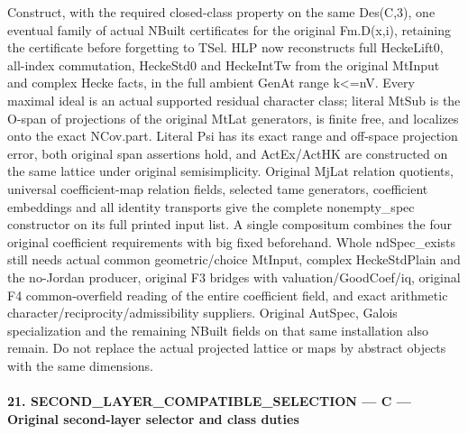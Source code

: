Construct, with the required closed-class property on the same Des(C,3), one eventual family of actual NBuilt certificates for the original Fm.D(x,i), retaining the certificate before forgetting to TSel. HLP now reconstructs full HeckeLift0, all-index commutation, HeckeStd0 and HeckeIntTw from the original MtInput and complex Hecke facts, in the full ambient GenAt range k<=nV. Every maximal ideal is an actual supported residual character class; literal MtSub is the O-span of projections of the original MtLat generators, is finite free, and localizes onto the exact NCov.part. Literal Psi has its exact range and off-space projection error, both original span assertions hold, and ActEx/ActHK are constructed on the same lattice under original semisimplicity. Original MjLat relation quotients, universal coefficient-map relation fields, selected tame generators, coefficient embeddings and all identity transports give the complete nonempty\_\allowbreak spec constructor on its full printed input list. A single compositum combines the four original coefficient requirements with big fixed beforehand. Whole ndSpec\_\allowbreak exists still needs actual common geometric/choice MtInput, complex HeckeStdPlain and the no-Jordan producer, original F3 bridges with valuation/GoodCoef/iq, original F4 common-overfield reading of the entire coefficient field, and exact arithmetic character/reciprocity/admissibility suppliers. Original AutSpec, Galois specialization and the remaining NBuilt fields on that same installation also remain. Do not replace the actual projected lattice or maps by abstract objects with the same dimensions.



\paragraph{21. SECOND\_\allowbreak LAYER\_\allowbreak COMPATIBLE\_\allowbreak SELECTION — C — Original second-layer selector and class duties}

